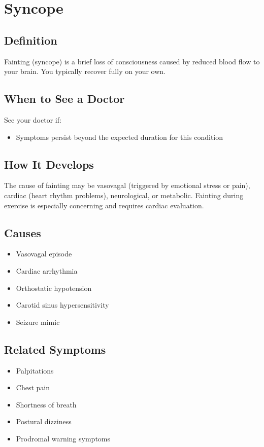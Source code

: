 \chapter{Syncope}

\section*{Definition}
Fainting (syncope) is a brief loss of consciousness caused by reduced blood flow to your brain. You typically recover fully on your own.

\section*{When to See a Doctor}
See your doctor if:
\begin{itemize}
  \item Symptoms persist beyond the expected duration for this condition
\end{itemize}

\section*{How It Develops}
The cause of fainting may be vasovagal (triggered by emotional stress or pain), cardiac (heart rhythm problems), neurological, or metabolic. Fainting during exercise is especially concerning and requires cardiac evaluation.

\section*{Causes}
\begin{itemize}
  \item Vasovagal episode
  \item Cardiac arrhythmia
  \item Orthostatic hypotension
  \item Carotid sinus hypersensitivity
  \item Seizure mimic
\end{itemize}

\section*{Related Symptoms}
\begin{itemize}
  \item Palpitations
  \item Chest pain
  \item Shortness of breath
  \item Postural dizziness
  \item Prodromal warning symptoms
\end{itemize}


